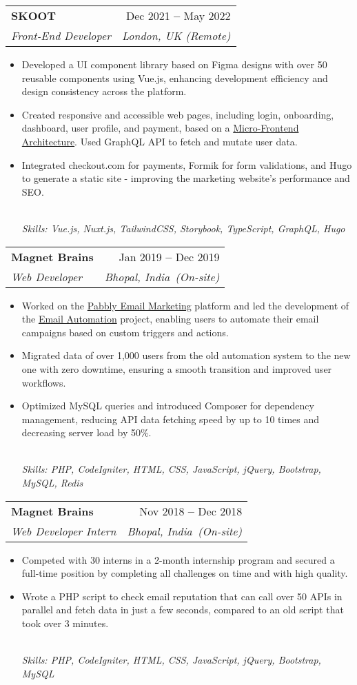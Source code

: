 \documentclass[letterpaper,12pt]{article}
\makeatletter
\newcommand{\resumeItem}[1]{
  \item\small{
    {#1 \vspace{-2pt}}
  }
}
\newcommand{\resumeSubheading}[5]{
  \vspace{-2pt}\item
    \begin{tabular*}{0.97\textwidth}[t]{l@{\extracolsep{\fill}}r}
      \textbf{#1} \iconLink{#2} & \small #3 \\
      \textit{\small#4} & \textit{\small #5} \\
    \end{tabular*}\vspace{-7pt}
}
\newcommand{\iconLink}[1]{
    \small\href{#1}{\color{blue}\faExternalLink}
}
\newcommand{\resumeItemFooter}[1]{
    \\ \vspace{5pt}\hspace{-0.35in}\footnotesize\emph{#1}
}
\newcommand{\resumeItemListStart}{\begin{itemize}}
\newcommand{\resumeItemListEnd}{\end{itemize}\vspace{-5pt}}
\def\myHometown{Bhopal, India}
\def\skootLink{https://skoot.eco}
\def\magnetBrainsLink{https://magnetbrains.com}
\def\rainbowWesternLink{https://rainbowwestern.com}
\def\microFrontendLink{https://micro-frontends.org}
\def\pabblyLink{https://pabbly.com/email-marketing}
\def\emailAutomationLink{https://youtube.com/watch?v=kkopsVYOO7Y}
\makeatother
\begin{document}
\resumeSubheading
{SKOOT}{\skootLink}{Dec 2021 \textbf{--} May 2022}
{Front-End Developer}{London, UK (Remote)}
\resumeItemListStart
\resumeItem{Developed a UI component library based on Figma designs with over 50 reusable components using Vue.js, enhancing development efficiency and design consistency across the platform.}
\resumeItem{Created responsive and accessible web pages, including login, onboarding, dashboard, user profile, and payment, based on a \href{\microFrontendLink}{\color{blue}Micro-Frontend Architecture}. Used GraphQL API to fetch and mutate user data.}
\resumeItem{Integrated checkout.com for payments, Formik for form validations, and Hugo to generate a static site - improving the marketing website's performance and SEO.}
\resumeItemFooter{Skills: Vue.js, Nuxt.js, TailwindCSS, Storybook, TypeScript, GraphQL, Hugo}
\resumeItemListEnd

\resumeSubheading
{Magnet Brains}{\magnetBrainsLink}{Jan 2019 \textbf{--} Dec 2019}
{Web Developer}{\myHometown\ (On-site)}
\resumeItemListStart
\resumeItem{Worked on the \href{\pabblyLink}{\color{blue}Pabbly Email Marketing} platform and led the development of the \href{\emailAutomationLink}{\color{blue}Email Automation} project, enabling users to automate their email campaigns based on custom triggers and actions.}
\resumeItem{Migrated data of over 1,000 users from the old automation system to the new one with zero downtime, ensuring a smooth transition and improved user workflows.}
\resumeItem{Optimized MySQL queries and introduced Composer for dependency management, reducing API data fetching speed by up to 10 times and decreasing server load by 50\%.}
\resumeItemFooter{Skills: PHP, CodeIgniter, HTML, CSS, JavaScript, jQuery, Bootstrap, MySQL, Redis}
\resumeItemListEnd

\resumeSubheading
{Magnet Brains}{\magnetBrainsLink}{Nov 2018 \textbf{--} Dec 2018}
{Web Developer Intern}{\myHometown\ (On-site)}
\resumeItemListStart
\resumeItem{Competed with 30 interns in a 2-month internship program and secured a full-time position by completing all challenges on time and with high quality.}
\resumeItem{Wrote a PHP script to check email reputation that can call over 50 APIs in parallel and fetch data in just a few seconds, compared to an old script that took over 3 minutes.}
\resumeItemFooter{Skills: PHP, CodeIgniter, HTML, CSS, JavaScript, jQuery, Bootstrap, MySQL}
\resumeItemListEnd

\end{document}
